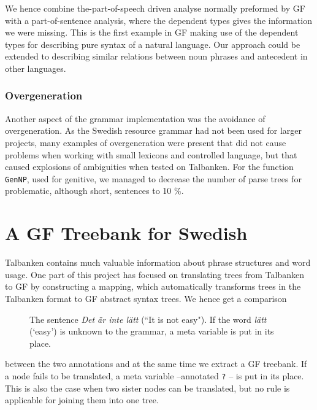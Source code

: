 \documentclass[runningheads,a4paper]{llncs}
\begin{document}
We hence combine the-part-of-speech driven analyse normally preformed by
GF with a part-of-sentence analysis, where the dependent types gives the 
information we were missing.
This is the first example in GF making use of the dependent types for 
describing pure syntax of a natural language. Our approach could be extended
to describing similar relations between 
noun phrases and antecedent in other languages.

\subsubsection{Overgeneration}
Another aspect of the grammar implementation was the avoidance of overgeneration. As
the Swedish resource grammar had not been used for larger projects, many examples of
overgeneration were present that did not cause problems when working with small
lexicons and controlled language, but that caused explosions of ambiguities when 
tested on Talbanken. For the function \verb-GenNP-, used for genitive, we managed
to decrease the number of parse trees for problematic, although short, sentences to 10 \%.




\section{A GF Treebank for Swedish}
\label{sec:mapping}


Talbanken contains much valuable information about phrase structures and word 
usage.
One part of this project has focused on translating trees from Talbanken to GF
by constructing a mapping, which automatically transforms trees in the
Talbanken format to GF abstract syntax trees. We hence get a comparison 
\begin{figure}[!h]
\centering
{}
\caption{The sentence \emph{Det är inte lätt} (``It is not easy"). If the word
         \emph{lätt} (`easy') is unknown to the grammar, a meta variable is put
         in its place.}
\label{fig:gftree1}
\end{figure}
between the two annotations and at the same time we extract a GF treebank.
If a node fails to be translated, a meta variable  --annotated \verb-?- -- is put in its place.
This is also the case when two sister nodes can be translated, but no rule is
applicable for joining them into one tree.
\end{document}

